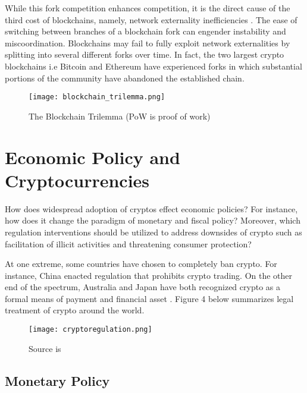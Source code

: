 \documentclass[12pt]{article}
\newcommand{\1}{\mathbbm 1}
\begin{document}
	 While this fork competition enhances competition, it is the direct cause of the third cost of blockchains, namely, network externality inefficiencies \cite{abadi2018blockchain}. The ease of switching between branches of a blockchain fork can engender instability and miscoordination. Blockchains may fail to fully exploit network externalities by splitting into several different forks over time. In fact, the two largest crypto blockchains i.e Bitcoin and Ethereum have experienced forks in which substantial portions of the community have abandoned the established chain.
	

	 
		
		
		
		
		\begin{figure}[H]
			\begin{Center}
				\texttt{[image: blockchain\_trilemma.png]}		
				\caption{The Blockchain Trilemma (PoW is proof of work)}
			\end{Center}
		\end{figure}
		
		\section{Economic Policy and Cryptocurrencies}
		
		How does widespread adoption of cryptos effect economic policies? For instance, how does it change the paradigm of monetary and fiscal policy? Moreover,  which regulation interventions should be utilized to address downsides of crypto such as facilitation of illicit activities and threatening consumer protection?
		
		At one extreme, some countries have chosen to completely ban crypto. For instance, China enacted regulation that prohibits crypto trading. On the other end of the spectrum, Australia and Japan have both recognized crypto as a formal means of payment and financial asset \cite{regulation2022}. Figure 4 below summarizes legal treatment of crypto around the world.
		
		
		\begin{figure}[H]
			\begin{Center}
				\texttt{[image: cryptoregulation.png]}		
				\caption{Source is \color{blue}{https://complyadvantage.com/insights}}
			\end{Center}
		\end{figure}
		
		\subsection{Monetary Policy}
		
\end{document}
